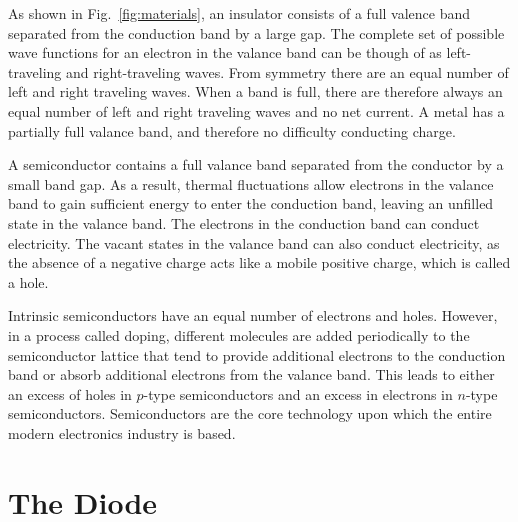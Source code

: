 \documentclass[12pt,oneside]{book}
\begin{document}
As shown in Fig.~\ref{fig:materials}, an insulator consists of a full valence band separated from the conduction band by a large gap.  The complete set of possible wave functions for an electron in the valance band can be though of as left-traveling and right-traveling waves.  From symmetry there are an equal number of left and right traveling waves.  When a band is full, there are therefore always an equal number of left and right traveling waves and no net current.  A metal has a partially full valance band, and therefore no difficulty conducting charge.

A semiconductor contains a full valance band separated from the conductor by a small band gap.  As a result, thermal fluctuations allow electrons in the valance band to gain sufficient energy to enter the conduction band, leaving an unfilled state in the valance band.  The electrons in the conduction band can conduct electricity.  The vacant states in the valance band can also conduct electricity, as the absence of a negative charge acts like a mobile positive charge, which is called a hole.

Intrinsic semiconductors have an equal number of electrons and holes.  However, in a process called doping, different molecules are added periodically to the semiconductor lattice that tend to provide additional electrons to the conduction band or absorb additional electrons from the valance band.  This leads to either an excess of holes in $p$-type semiconductors and an excess in electrons in $n$-type semiconductors.  Semiconductors are the core technology upon which the entire modern electronics industry is based.

\section{The Diode}
\end{document}
